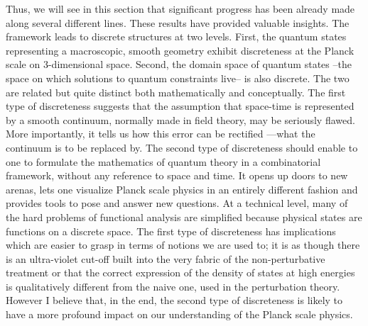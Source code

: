 Thus, we will see in this section that significant progress has been already
made along several different lines. These results have provided valuable
insights. The framework leads to discrete structures at two levels. First,
the quantum states representing a macroscopic, smooth geometry exhibit
discreteness at the Planck scale on 3-dimensional space. Second, the domain
space of quantum states --the space on which solutions to quantum constraints
live-- is also discrete. The two are related but quite distinct both
mathematically and conceptually. The first type of discreteness suggests that
the assumption that space-time is represented by a smooth continuum, normally
made in field theory, may be seriously flawed. More importantly, it tells
us how this error can be rectified ---what the continuum is to be replaced
by. The second type of discreteness should enable to one to formulate the
mathematics of quantum theory in a combinatorial framework, without any
reference to space and time. It opens up doors to new arenas, lets one
visualize Planck scale physics in an entirely different fashion and provides
tools to pose and answer new questions. At a technical level, many of the hard
problems of functional analysis are simplified because physical states
are functions on a discrete space. The first type of discreteness has
implications which are easier to grasp in terms of notions we are used to;
it is as though there is an ultra-violet cut-off built into the very fabric of
the non-perturbative treatment or that the correct expression of the density
of states at high energies is qualitatively different from the naive one, used
in the perturbation theory. However I believe that, in the end, the second
type of discreteness is likely to have a more profound impact on our
understanding of the Planck scale physics.

